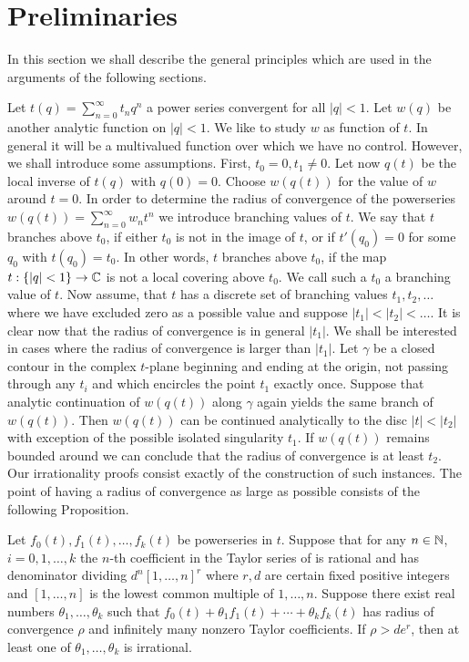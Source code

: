 \section{Preliminaries}

In this section we shall describe the general principles which are used in the arguments of the following sections.

Let $t(q) = \sum_{n=0}^{\infty} t_n q^n$ a power series convergent for all $|q| < 1$.
Let $w(q)$ be another analytic function on $|q| < 1$.
We like to study $w$ as function of $t$.
In general it will be a multivalued function over which we have no control.
However, we shall introduce some assumptions.
First, $t_0 = 0, t_1 \ne 0$.
Let now $q(t)$ be the local inverse of $t(q)$ with $q(0) = 0$.
Choose $w(q(t))$ for the value of $w$ around $t = 0$.
In order to determine the radius of convergence of the powerseries $w(q(t)) = \sum_{n=0}^{\infty} w_n t^n$ we introduce branching values of $t$.
We say that $t$ branches above $t_0$, if either $t_0$ is not in the image of $t$, or if $t'(q_0) = 0$ for some $q_0$ with $t(q_0) = t_0$.
In other words, $t$ branches above $t_0$, if the map $t : \{|q| < 1\} \to \mathbb{C}$ is not a local covering above $t_0$.
We call such a $t_0$ a branching value of $t$.
Now assume, that $t$ has a discrete set of branching values $t_1, t_2, \dots$ where we have excluded zero as a possible value and suppose $|t_1| < |t_2| < \dots$.
It is clear now that the radius of convergence is in general $|t_1|$.
We shall be interested in cases where the radius of convergence is larger than $|t_1|$.
Let $\gamma$ be a closed contour in the complex $t$-plane beginning and ending at the origin, not passing through any $t_i$ and which encircles the point $t_1$ exactly once.
Suppose that analytic continuation of $w(q(t))$ along $\gamma$ again yields the same branch of $w(q(t))$.
Then $w(q(t))$ can be continued analytically to the disc $|t| < |t_2|$ with exception of the possible isolated singularity $t_1$.
If $w(q(t))$ remains bounded around we can conclude that the radius of convergence is at least $t_2$.
Our irrationality proofs consist exactly of the construction of such instances.
The point of having a radius of convergence as large as possible consists of the following Proposition.

\begin{proposition}
    \label{prop:1.1}
    Let $f_0(t), f_1(t), \dots, f_k(t)$ be powerseries in $t$.
    Suppose that for any $n \in \mathbb{N}$, $i = 0, 1, \dots, k$ the $n$-th coefficient in the Taylor series of is rational and has denominator dividing $d^n [1, \dots, n]^r$
     where $r, d$ are certain fixed positive integers and $[1, \dots, n]$ is the lowest common multiple of $1, \dots, n$.
    Suppose there exist real numbers $\theta_1, \dots, \theta_k$ such that $f_0(t) + \theta_1 f_1(t) + \cdots + \theta_k f_k(t)$ has radius of convergence $\rho$ and infinitely many nonzero Taylor coefficients.
    If $\rho > d e^r$, then at least one of $\theta_1, \dots, \theta_k$ is irrational.
\end{proposition}

